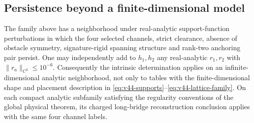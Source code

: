 \subsection{Persistence beyond a finite-dimensional model}

\begin{proposition}
\label{prop:v44-analytic-neighborhood}
The family above has a neighborhood under real-analytic support-function
perturbations in which the four selected channels, strict clearance,
absence of obstacle symmetry, signature-rigid spanning structure and
rank-two anchoring pair persist.  One may independently add to $h_1,h_2$
any real-analytic $r_1,r_2$ with $\|r_a\|_{C^2}\le10^{-6}$.
Consequently the intrinsic determination applies on an
infinite-dimensional analytic neighborhood, not only to tables with the
finite-dimensional shape and placement description in
\eqref{eq:v44-supports}--\eqref{eq:v44-lattice-family}.
On each compact analytic subfamily satisfying the regularity conventions
of the global physical theorem, its charged long-bridge reconstruction
conclusion applies with the same four channel labels.
\end{proposition}

